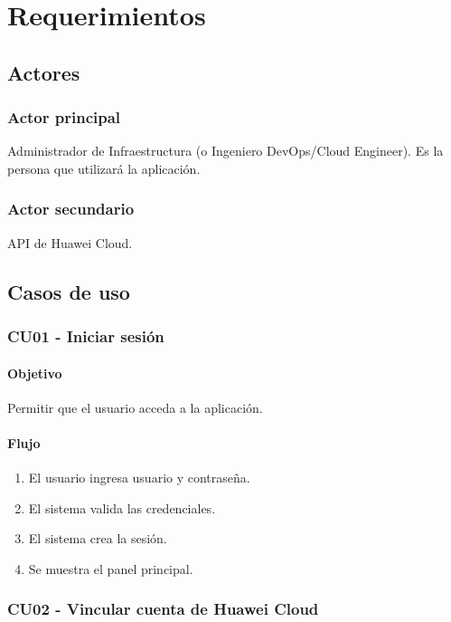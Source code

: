 ﻿\chapter{Requerimientos}

\section{Actores}

\subsection*{Actor principal}

Administrador de Infraestructura (o Ingeniero DevOps/Cloud Engineer). Es la persona que utilizará la aplicación.

\subsection*{Actor secundario}

API de Huawei Cloud.

\section{Casos de uso}

\subsection{CU01 - Iniciar sesión}

\subsubsection*{Objetivo}

Permitir que el usuario acceda a la aplicación.

\subsubsection*{Flujo}

\begin{enumerate}
\item El usuario ingresa usuario y contraseña.
\item El sistema valida las credenciales.
\item El sistema crea la sesión.
\item Se muestra el panel principal.
\end{enumerate}

\subsection{CU02 - Vincular cuenta de Huawei Cloud}

